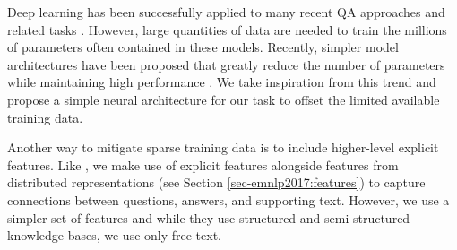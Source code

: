 Deep learning has been successfully applied to many recent QA approaches and related tasks \citep[][inter alia]{Bordes2015LargescaleSQ,nips15_hermann, He2016CharacterLevelQA, dong2015question, Tan2016ImprovedRL}.
However, large quantities of data are needed to train the millions of parameters often contained in these models.  
Recently, simpler model architectures have been proposed that greatly reduce the number of parameters while maintaining high performance \cite[e.g.,][]{Iyyer2015,chen2016thorough,Parikh2016ADA}.  
We take inspiration from this trend and propose a simple neural architecture for our task to offset the limited available training data. 


Another way to mitigate sparse training data is to include higher-level explicit features.  Like \citet{sachan2016science}, we make use of explicit features alongside features from distributed representations (see Section \ref{sec-emnlp2017:features}) to capture connections between questions, answers, and supporting text.  However, we use a simpler set of features and while they use structured and semi-structured knowledge bases, we use only free-text.  %


